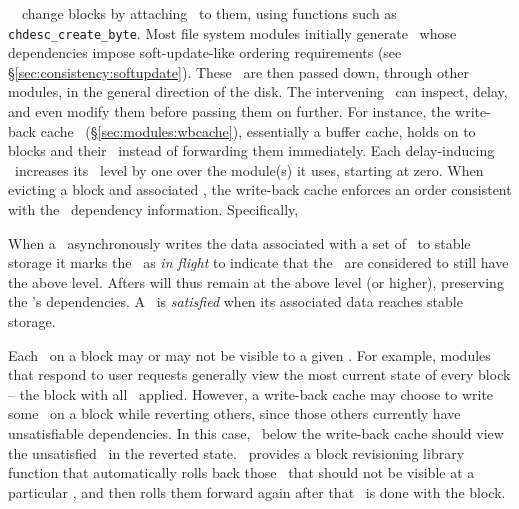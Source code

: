 \Kudos\ \modules\ change blocks by attaching \chdescs\ to them,
using functions such as \texttt{chdesc\_create\_byte}.
%
Most file system modules initially generate \chdescs\ whose
dependencies impose soft-update-like ordering requirements (see
\S\ref{sec:consistency:softupdate}).  These \chdescs\ are then passed down,
through other modules, in the general direction of the disk.  The
intervening \modules\ can
inspect, delay, and even modify them before passing them on further. For
instance, the write-back cache \module\ (\S\ref{sec:modules:wbcache}),
essentially a buffer cache, holds
on to blocks and their \chdescs\ instead of forwarding them
immediately. Each delay-inducing \module\ increases its \module\
level by one over the module(s) it uses, starting at zero.
%
When evicting a block and associated \chdescs, the write-back
cache enforces an order consistent with the \chdesc\ dependency
information. Specifically,

When a \module\ asynchronously writes the data associated with a set
of \chdescs\ to stable storage it marks the \chdescs\ as
\emph{in flight} to indicate that the \chdescs\ are considered to still
have the above level. Afters will thus remain at the above level (or
higher), preserving the \chdescs{}'s dependencies.
%
A \chdesc\ is \emph{satisfied} when its associated data reaches stable
storage.

Each \chdesc\ on a block may or may not be visible to a given \module.
%
For example, modules that respond to user requests generally view the most
 current state of every block -- the block with all \chdescs\ applied.
%
However, a write-back cache may choose to write some \chdescs\ on a block
 while reverting others, since those others currently have unsatisfiable
 dependencies.
%
In this case, \modules\ below the write-back cache should view the
 unsatisfied \chdescs\ in the reverted state.
%
%
\Kudos\ provides a block revisioning library function that automatically rolls back those
 \chdescs\ that should not be visible at a particular \module, and then
 rolls them forward again after that \module\ is done with the block.


